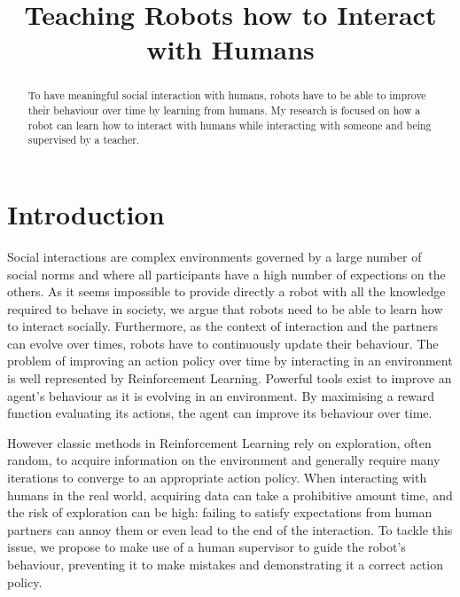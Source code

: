 \documentclass[conference]{IEEEtran}
\begin{document}
\title{Teaching Robots how to Interact with Humans}

\author{
}

\maketitle

\begin{abstract}

To have meaningful social interaction with humans, robots have to be able to improve
    their behaviour over time by learning from humans. My research is
    focused on how a robot can learn how to interact with humans while
    interacting with someone and being supervised by a teacher.

\end{abstract}

\section{Introduction}

Social interactions are complex environments governed by a large number of
social norms and where all participants have a high number of expections on the
others.  As it seems impossible to provide directly a robot with all the
knowledge required to behave in society, we argue that robots need to be able to
learn how to interact socially. Furthermore, as the context of interaction and
the partners can evolve over times, robots have to continuously update their
behaviour.  The problem of improving an action policy over time by interacting
in an environment is well represented by Reinforcement Learning. Powerful tools
exist to improve an agent's behaviour as it is evolving in an environment. By
maximising a reward function evaluating its actions, the agent can improve its
behaviour over time. 

However classic methods in Reinforcement Learning rely on exploration, often
random, to acquire information on the environment and generally require many
iterations to converge to an appropriate action policy. When interacting with
humans in the real world, acquiring data can take a prohibitive amount time, and the
risk of exploration can be high: failing to satisfy expectations from human
partners can annoy them or even lead to the end of the interaction. To
tackle this issue, we propose to make use of a human supervisor to guide the
robot's behaviour, preventing it to make mistakes and demonstrating it a correct
action policy.
\end{document}
